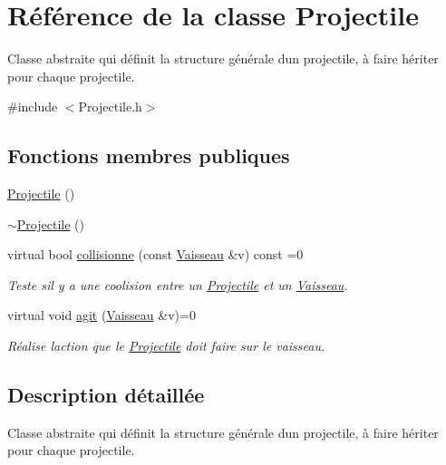 \hypertarget{class_projectile}{}\section{Référence de la classe Projectile}
\label{class_projectile}


Classe abstraite qui définit la structure générale d\textquotesingle{}un projectile, à faire hériter pour chaque projectile.  




{\ttfamily \#include $<$Projectile.\+h$>$}

\subsection*{Fonctions membres publiques}
\begin{DoxyCompactItemize}
\item 
\hyperlink{class_projectile_ac536ed2aad56af866a2078b9a85aa16d}{Projectile} ()
\item 
\hyperlink{class_projectile_a94903e021fa2edab60ba3836ca0b937d}{$\sim$\+Projectile} ()
\item 
virtual bool \hyperlink{class_projectile_aa5d38357da8a5fdc622b248a449523a5}{collisionne} (const \hyperlink{class_vaisseau}{Vaisseau} \&v) const =0
\begin{DoxyCompactList}\small\item\em Teste s\textquotesingle{}il y a une coolision entre un {\ttfamily \hyperlink{class_projectile}{Projectile}} et un {\ttfamily \hyperlink{class_vaisseau}{Vaisseau}}. \end{DoxyCompactList}\item 
virtual void \hyperlink{class_projectile_a8550c8b1b012c5c290fb6da5b06f57ef}{agit} (\hyperlink{class_vaisseau}{Vaisseau} \&v)=0
\begin{DoxyCompactList}\small\item\em Réalise l\textquotesingle{}action que le {\ttfamily \hyperlink{class_projectile}{Projectile}} doit faire sur le vaisseau. \end{DoxyCompactList}\end{DoxyCompactItemize}


\subsection{Description détaillée}
Classe abstraite qui définit la structure générale d\textquotesingle{}un projectile, à faire hériter pour chaque projectile. 

